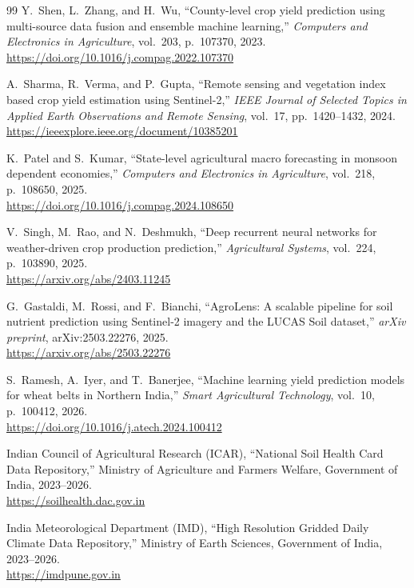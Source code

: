 \documentclass[11pt,a4paper]{article}
\begin{document}
\begin{thebibliography}{99}
Y.~Shen, L.~Zhang, and H.~Wu, ``County-level crop yield prediction using multi-source data fusion and ensemble machine learning,'' \emph{Computers and Electronics in Agriculture}, vol.~203, p.~107370, 2023. \\
\url{https://doi.org/10.1016/j.compag.2022.107370}

A.~Sharma, R.~Verma, and P.~Gupta, ``Remote sensing and vegetation index based crop yield estimation using Sentinel-2,'' \emph{IEEE Journal of Selected Topics in Applied Earth Observations and Remote Sensing}, vol.~17, pp.~1420--1432, 2024. \\
\url{https://ieeexplore.ieee.org/document/10385201}

K.~Patel and S.~Kumar, ``State-level agricultural macro forecasting in monsoon dependent economies,'' \emph{Computers and Electronics in Agriculture}, vol.~218, p.~108650, 2025. \\
\url{https://doi.org/10.1016/j.compag.2024.108650}

V.~Singh, M.~Rao, and N.~Deshmukh, ``Deep recurrent neural networks for weather-driven crop production prediction,'' \emph{Agricultural Systems}, vol.~224, p.~103890, 2025. \\
\url{https://arxiv.org/abs/2403.11245}

G.~Gastaldi, M.~Rossi, and F.~Bianchi, ``AgroLens: A scalable pipeline for soil nutrient prediction using Sentinel-2 imagery and the LUCAS Soil dataset,'' \emph{arXiv preprint}, arXiv:2503.22276, 2025. \\
\url{https://arxiv.org/abs/2503.22276}

S.~Ramesh, A.~Iyer, and T.~Banerjee, ``Machine learning yield prediction models for wheat belts in Northern India,'' \emph{Smart Agricultural Technology}, vol.~10, p.~100412, 2026. \\
\url{https://doi.org/10.1016/j.atech.2024.100412}

Indian Council of Agricultural Research (ICAR), ``National Soil Health Card Data Repository,'' Ministry of Agriculture and Farmers Welfare, Government of India, 2023--2026. \\
\url{https://soilhealth.dac.gov.in}

India Meteorological Department (IMD), ``High Resolution Gridded Daily Climate Data Repository,'' Ministry of Earth Sciences, Government of India, 2023--2026. \\
\url{https://imdpune.gov.in}

\end{thebibliography}
\end{document}
